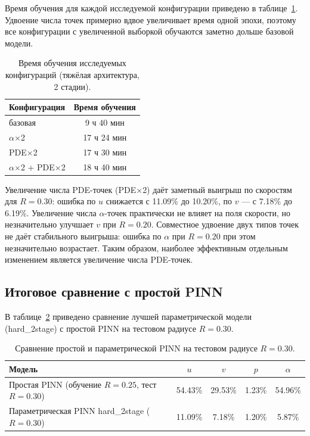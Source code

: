 Время обучения для каждой исследуемой конфигурации приведено в
таблице~\ref{tab:ablation_time}. Удвоение числа точек примерно вдвое увеличивает
время одной эпохи, поэтому все конфигурации с увеличенной выборкой обучаются
заметно дольше базовой модели.

\begin{table}[H]
    \centering
    \caption{Время обучения исследуемых конфигураций (тяжёлая архитектура, 2 стадии).}
    \label{tab:ablation_time}
    \begin{tabular}{l|c}
        \hline
        Конфигурация & Время обучения \\
        \hline
        базовая                             & 9 ч 40 мин \\
        \(\alpha\)$\times$2                 & 17 ч 24 мин \\
        PDE$\times$2                        & 17 ч 30 мин \\
        \(\alpha\)$\times$2 + PDE$\times$2  & 18 ч 40 мин \\
        \hline
    \end{tabular}
\end{table}

Увеличение числа PDE-точек (PDE$\times$2) даёт заметный выигрыш по скоростям
для \(R=0.30\): ошибка по \(u\) снижается с 11.09\% до 10.20\%, по \(v\) ---
с 7.18\% до 6.19\%. Увеличение числа \(\alpha\)-точек практически не влияет на
поля скорости, но незначительно улучшает \(v\) при \(R=0.20\). Совместное
удвоение двух типов точек не даёт стабильного выигрыша: ошибка по \(\alpha\)
при \(R=0.20\) при этом незначительно возрастает. Таким образом, наиболее
эффективным отдельным изменением является увеличение числа PDE-точек.

\subsection{Итоговое сравнение с простой PINN}

В таблице~\ref{tab:simple_vs_param} приведено сравнение лучшей параметрической
модели (hard\_2stage) с простой PINN на тестовом радиусе \(R=0.30\).

\begin{table}[H]
    \centering
    \caption{Сравнение простой и параметрической PINN на тестовом радиусе \(R=0.30\).}
    \label{tab:simple_vs_param}
    \begin{tabularx}{\textwidth}{X|cccc}
        \hline
        Модель & \(u\) & \(v\) & \(p\) & \(\alpha\) \\
        \hline
        Простая PINN (обучение \(R=0.25\), тест \(R=0.30\)) & 54.43\% & 29.53\% & 1.23\% & 54.96\% \\
        Параметрическая PINN hard\_2stage (\(R=0.30\))        & 11.09\% & 7.18\% & 1.20\% & 5.87\% \\
        \hline
    \end{tabularx}
\end{table}

